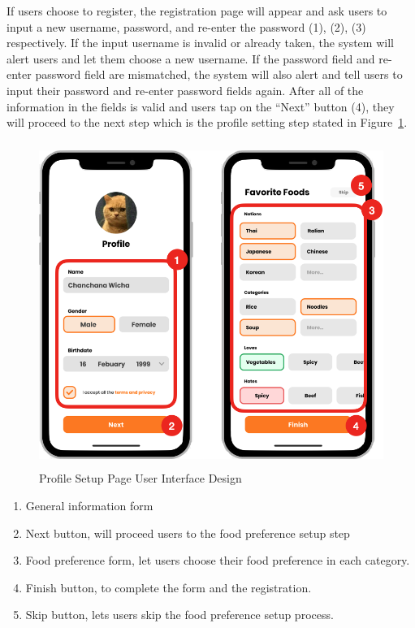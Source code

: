 \documentclass[12pt,oneside,openright,a4paper]{cpe-english-project}
\begin{document}
If users choose to register, the registration page will appear and ask users to input a new username, password, and re-enter the password (1), (2), (3) respectively. If the input username is invalid or already taken, the system will alert users and let them choose a new username. If the password field and re-enter password field are mismatched, the system will also alert and tell users to input their password and re-enter password fields again. After all of the information in the fields is valid and users tap on the “Next” button (4), they will proceed to the next step which is the profile setting step stated in Figure~\ref{fig:3ui_ProfileSetupPageUserInterfaceDesign}.

\newpage
\begin{figure}[H]\centering
\includegraphics[height=300pt]{./images/3ui_ProfileSetupPageUserInterfaceDesign.png}
\caption{Profile Setup Page User Interface Design}\label{fig:3ui_ProfileSetupPageUserInterfaceDesign}
\end{figure}\vspace{-24pt}

\begin{enumerate}
\item General information form
\item Next button, will proceed users to the food preference setup step
\item Food preference form, let users choose their food preference in each category.
\item Finish button, to complete the form and the registration.
\item Skip button, lets users skip the food preference setup process.
\end{enumerate}
\end{document}
